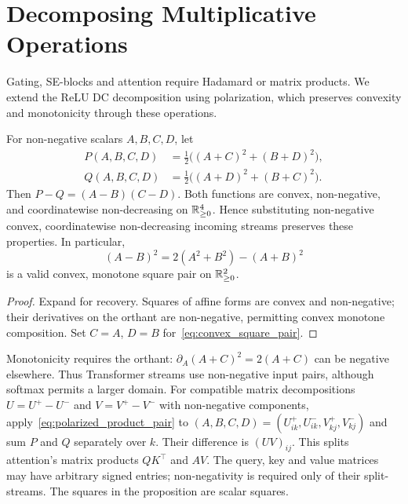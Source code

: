 \section{Decomposing Multiplicative Operations}\label{sec:multiplicative_splits}

Gating, SE-blocks and attention require Hadamard or matrix products. We extend the ReLU DC decomposition using polarization, which preserves convexity and monotonicity through these operations.

\begin{proposition}\label{prop:convex_product_pair}
For non-negative scalars $A,B,C,D$, let
\begin{equation}
\begin{aligned}
    P(A,B,C,D)&=\tfrac12\bigl((A+C)^2+(B+D)^2\bigr),\\
    Q(A,B,C,D)&=\tfrac12\bigl((A+D)^2+(B+C)^2\bigr).
\end{aligned}
    \label{eq:polarized_product_pair}
\end{equation}
Then $P-Q=(A-B)(C-D)$. Both functions are convex, non-negative, and coordinatewise non-decreasing on $\mathbb{R}^4_{\ge0}$. Hence substituting non-negative convex, coordinatewise non-decreasing incoming streams preserves these properties. In particular,
\begin{equation}
    (A-B)^2=2(A^2+B^2)-(A+B)^2
    \label{eq:convex_square_pair}
\end{equation}
is a valid convex, monotone square pair on $\mathbb{R}^2_{\ge0}$.
\end{proposition}

\begin{proof}
Expand for recovery. Squares of affine forms are convex and non-negative; their derivatives on the orthant are non-negative, permitting convex monotone composition. Set $C=A$, $D=B$ for~\eqref{eq:convex_square_pair}.
\end{proof}

Monotonicity requires the orthant: $\partial_A(A+C)^2=2(A+C)$ can be negative elsewhere. Thus Transformer streams use non-negative input pairs, although softmax permits a larger domain. For compatible matrix decompositions $U=U^+-U^-$ and $V=V^+-V^-$ with non-negative components, apply~\eqref{eq:polarized_product_pair} to $(A,B,C,D)=(U^+_{ik},U^-_{ik},V^+_{kj},V^-_{kj})$ and sum $P$ and $Q$ separately over $k$. Their difference is $(UV)_{ij}$. This splits attention's matrix products $QK^\top$ and $AV$. The query, key and value matrices may have arbitrary signed entries; non-negativity is required only of their split-streams. The squares in the proposition are scalar squares.

